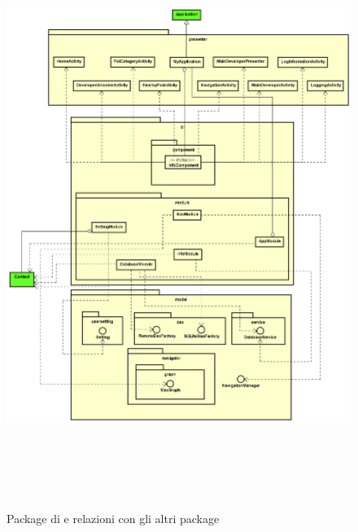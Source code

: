 \documentclass[../DefinizioneDiProdotto.tex,lanscape]{subfiles}
\begin{document}
\begin{figure}[p]
	\centering
	\includegraphics[height=19cm,width=\textwidth]{diagrams/ModelCompleteNoMethods/PNGpackage/di}
	\caption{Package di e relazioni con gli altri package}
	\label{diPackage}
\end{figure}
\end{document}
